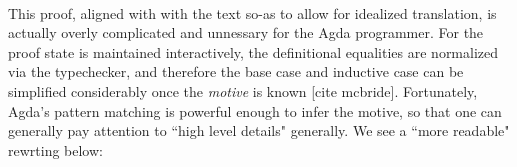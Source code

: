 \begin{code}
%
\>[12]\AgdaSpace{}%
\AgdaSymbol{(}\AgdaSpace{}%
\AgdaSpace{}%
\AgdaOperator{\AgdaFunction{+}}\AgdaSpace{}%
\AgdaSpace{}%
\AgdaOperator{\AgdaFunction{+}}\AgdaSpace{}%
\AgdaSymbol{)}\AgdaSpace{}%
\AgdaSpace{}%
\AgdaSymbol{(}\AgdaSpace{}%
\AgdaSpace{}%
\AgdaOperator{\AgdaFunction{+}}\AgdaSpace{}%
\AgdaSymbol{(}\AgdaSpace{}%
\AgdaOperator{\AgdaFunction{+}}\AgdaSpace{}%
\AgdaSymbol{))}\<%
\\
%
\>[4]\AgdaSpace{}%
\AgdaSpace{}%
\AgdaSpace{}%
\AgdaSymbol{=}\AgdaSpace{}%
\<%
\end{code}

This proof, aligned with with the text so-as to allow for idealized translation,
is actually overly complicated and unnessary for the Agda programmer. For the
proof state is maintained interactively, the definitional equalities are
normalized via the typechecker, and therefore the base case and inductive case
can be simplified considerably once the \emph{motive} is known [cite mcbride].
Fortunately, Agda's pattern matching is powerful enough to infer the motive, so
that one can generally pay attention to ``high level details" generally. We see
a ``more readable" rewrting below:

